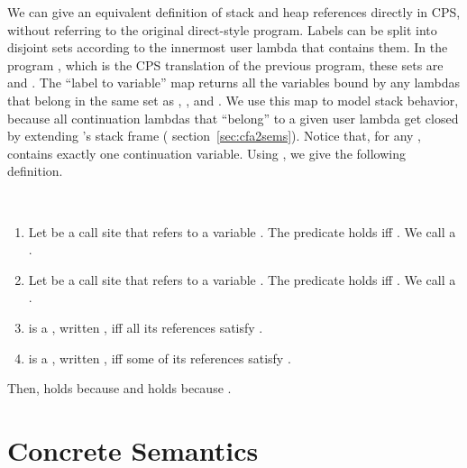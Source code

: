 \documentclass{LMCS}
\theoremstyle{definition} \newtheorem{property}[thm]{Property}
\begin{document}
We can give an equivalent definition of stack and heap references directly in
CPS, without referring to the original direct-style program.
Labels can be split into disjoint sets according to the innermost user lambda 
that contains them.
In the program , 
which is the CPS translation of the previous program, these sets are 
and .
The ``label to variable'' map \ltov{\psi} returns all the variables bound by 
any lambdas that belong in the same set as , \eg,  and .
We use this map to model stack behavior, because all continuation lambdas that 
``belong'' to a given user lambda  get closed by extending 
's stack frame (\confer{} section~\ref{sec:cfa2sems}).
Notice that, for any , \ltov{\psi} contains exactly one continuation 
variable.
Using \ltovNA, we give the following definition.
\vfill\eject

\begin{defi} 
  ~ \begin{enumerate}[]
  \item
    Let  be a call site that refers to a variable .
    The predicate  holds iff .
    We call  a .
  \item
    Let  be a call site that refers to a variable .
    The predicate  holds iff .
    We call  a .
  \item
     is a , written , iff all its references 
    satisfy \instackNA.
  \item
     is a , written , iff some of its references
    satisfy \inheapNA.
  \end{enumerate}
\end{defi}
\noindent
Then,  holds because  and  holds because
.


\section{Concrete Semantics}
\end{document}
